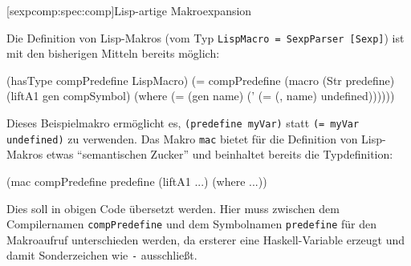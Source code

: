 \documentclass[11pt, a4paper, bibgerm]{scrbook}
\newcommand\icode[1]{\lstinline?#1?}
\newcommand\lsubsection{}
\begin{document}
\lsubsection[sexpcomp:spec:comp]{Lisp-artige Makroexpansion}

Die Definition von Lisp-Makros (vom Typ \icode{LispMacro = SexpParser [Sexp]}) ist mit
den bisherigen Mitteln bereits möglich:
\begin{code}
(hasType compPredefine LispMacro)
(= compPredefine (macro (Str predefine)
                     (liftA1 gen compSymbol)
                   (where (= (gen name)
                             (' (= (, name) undefined))))))

\end{code}
Dieses Beispielmakro ermöglicht es, \icode{(predefine myVar)} statt
\icode{(= myVar undefined)} zu verwenden. Das Makro \icode{mac} bietet
für die Definition von Lisp-Makros etwas ``semantischen Zucker'' und
beinhaltet bereits die Typdefinition:
\begin{code}
(mac compPredefine predefine
     (liftA1 ...)
   (where ...))
\end{code}
Dies soll in obigen Code übersetzt werden. Hier muss zwischen dem
Compilernamen \icode{compPredefine} und dem Symbolnamen
\icode{predefine} für den Makroaufruf unterschieden werden, da ersterer
eine Haskell-Variable erzeugt und damit Sonderzeichen wie \icode{-}
ausschließt.
\end{document}
